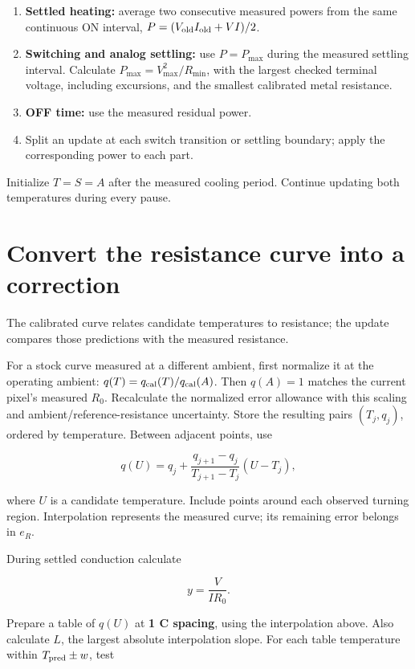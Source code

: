 \documentclass[11pt,letterpaper]{article}
\begin{document}
\begin{enumerate}[start=1]
\item \textbf{Settled heating:} average two consecutive measured powers from the same continuous ON interval, \(P=(V_{\rm old}I_{\rm old}+VI)/2\).
\item \textbf{Switching and analog settling:} use \(P=P_{\max}\) during the measured settling interval. Calculate \(P_{\max}=V_{\max}^2/R_{\min}\), with the largest checked terminal voltage, including excursions, and the smallest calibrated metal resistance.
\item \textbf{OFF time:} use the measured residual power.
\item Split an update at each switch transition or settling boundary; apply the corresponding power to each part.
\end{enumerate}

Initialize \(T=S=A\) after the measured cooling period. Continue updating both temperatures during every pause.

\section{Convert the resistance curve into a correction}

The calibrated curve relates candidate temperatures to resistance; the update compares those predictions with the measured resistance.

For a stock curve measured at a different ambient, first normalize it at the operating ambient: \(q(T)=q_{\rm cal}(T)/q_{\rm cal}(A)\). Then \(q(A)=1\) matches the current pixel's measured \(R_0\). Recalculate the normalized error allowance with this scaling and ambient/reference-resistance uncertainty. Store the resulting pairs \((T_j,q_j)\), ordered by temperature. Between adjacent points, use

\[
q(U)=q_j+\frac{q_{j+1}-q_j}{T_{j+1}-T_j}(U-T_j),
\]

where \(U\) is a candidate temperature. Include points around each observed turning region. Interpolation represents the measured curve; its remaining error belongs in \(e_R\).

During settled conduction calculate

\[
y=\frac{V}{I R_0}.
\]

Prepare a table of \(q(U)\) at \textbf{1 \textdegree{}C spacing}, using the interpolation above. Also calculate \(L\), the largest absolute interpolation slope. For each table temperature within \(T_{\rm pred}\pm w\), test
\end{document}
